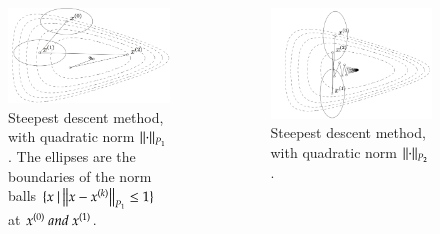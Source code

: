 \begin{frame}
{\begin{columns}
  \begin{column}{0.5\textwidth}
    \begin{figure}[t]
      \includegraphics[scale=0.15]{pics/911.png}
      \caption{\tiny Steepest descent method, with quadratic norm
        $\left\lVert\cdot\right\rVert_{P_1}$. The ellipses are the boundaries of the
        norm balls $\{x ~ | \left\lVert x - x^{(k)}\right\rVert_{P_1} \le 1\}$ at $x^{(0)}
        ~and~ x^{(1)}$.}
    \end{figure}
  \end{column}


  \begin{column}{0.5\textwidth}
    \begin{figure}[t]
      \includegraphics[scale=0.12]{pics/912.png}
      \caption{\tiny Steepest descent method, with quadratic norm
        $\left\lVert\cdot\right\rVert_{P_2}$.}
    \end{figure}
  \end{column}
\end{columns}
}


\end{frame}
